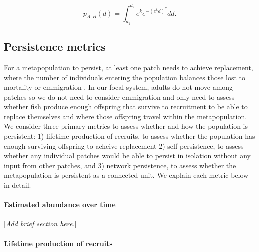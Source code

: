 \documentclass[12pt, oneside]{article}   	%
\begin{document}
\begin{equation} %
p_{A, B}(d) = \int_{d_1}^{d_2} e^k e^{-(e^k d)^\theta}  dd. \label{EQN_integratingDK}
\end{equation}

\subsection*{Persistence metrics}


For a metapopulation to persist, at least one patch needs to achieve replacement, where the number of individuals entering the population balances those lost to mortality or emmigration \citep{burgess2014beyond}. In our focal system, adults do not move among patches so we do not need to consider emmigration and only need to assess whether fish produce enough offspring that survive to recruitment to be able to replace themselves and where those offspring travel within the metapopulation. We consider three primary metrics to assess whether and how the population is persistent: 1) lifetime production of recruits, to assess whether the population has enough surviving offspring to acheive replacement 2) self-persistence, to assess whether any individual patches would be able to persist in isolation without any input from other patches, and 3) network persistence, to assess whether the metapopulation is persistent as a connected unit. We explain each metric below in detail. %


\paragraph*{Estimated abundance over time}

[\textit{Add brief section here.}]

\paragraph*{Lifetime production of recruits}

\end{document}
